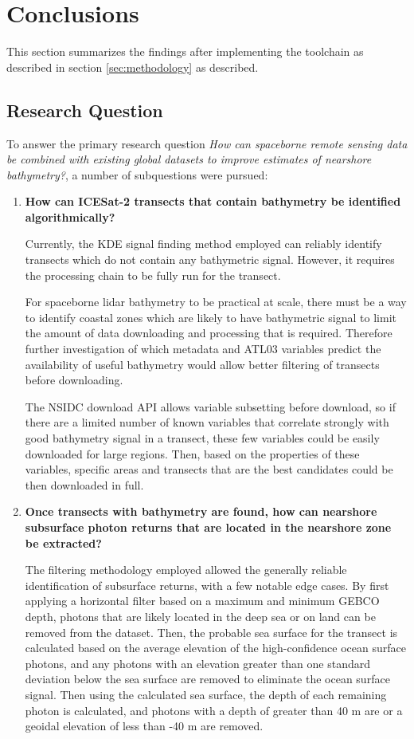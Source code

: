 \chapter{Conclusions}
This section summarizes the findings after implementing the toolchain as described in section \ref{sec:methodology} as described.

\section{Research Question}
To answer the primary research question \emph{How can spaceborne remote sensing data be combined with existing global datasets to improve estimates of nearshore bathymetry?}, a number of subquestions were pursued:

\begin{enumerate}
    \item \textbf{How can ICESat-2 transects that contain bathymetry be identified algorithmically?}

    Currently, the KDE signal finding method employed can reliably identify transects which do not contain any bathymetric signal. However, it requires the processing chain to be fully run for the transect. 
    
    For spaceborne lidar bathymetry to be practical at scale, there must be a way to identify coastal zones which are likely to have bathymetric signal to limit the amount of data downloading and processing that is required. Therefore further investigation of which metadata and ATL03 variables predict the availability of useful bathymetry would allow better filtering of transects before downloading. 
    
    The NSIDC download API allows variable subsetting before download, so if there are a limited number of known variables that correlate strongly with good bathymetry signal in a transect, these few variables could be easily downloaded for large regions.  
    Then, based on the properties of these variables, specific areas and transects that are the best candidates could be then downloaded in full.
    
    \item \textbf{Once transects with bathymetry are found, how can nearshore subsurface photon returns that are located in the nearshore zone be extracted?}
    
    The filtering methodology employed allowed the generally reliable identification of subsurface returns, with a few notable edge cases. By first applying a horizontal filter based on a maximum and minimum GEBCO depth, photons that are likely located in the deep sea or on land can be removed from the dataset. Then, the probable sea surface for the transect is calculated based on the average elevation of the high-confidence ocean surface photons, and any photons with an elevation greater than one standard deviation below the sea surface are removed to eliminate the ocean surface signal. Then using the calculated sea surface, the depth of each remaining photon is calculated, and photons with a depth of greater than 40 m are or a geoidal elevation of less than -40 m are removed. 
    

\end{enumerate}
